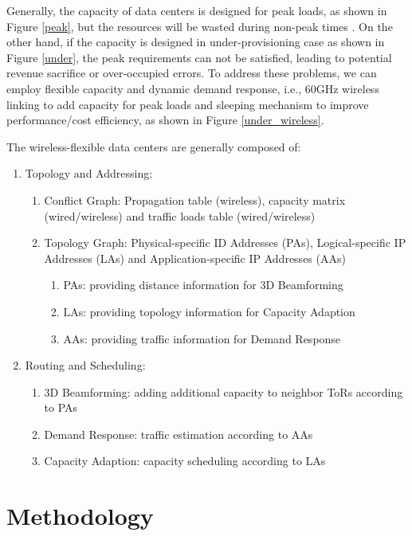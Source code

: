 \documentclass[journal,onecolumn,11pt]{IEEEtran}
\begin{document}
Generally, the capacity of data centers is designed for peak loads, as shown in Figure \ref{peak}, but the resources will be wasted during non-peak times \cite{Armbrust:2010:VCC:1721654.1721672}. On the other hand, if the capacity is designed in under-provisioning case as shown in Figure \ref{under}, the peak requirements can not be satisfied, leading to potential revenue sacrifice or over-occupied errors. To address these problems, we can employ flexible capacity and dynamic demand response, i.e., 60GHz wireless linking to add capacity for peak loads and sleeping mechanism to improve performance/cost efficiency, as shown in Figure \ref{under_wireless}.

The wireless-flexible data centers are generally composed of:
\begin{enumerate}
  \item Topology and Addressing:
  \begin{enumerate}
    \item Conflict Graph: Propagation table (wireless), capacity matrix (wired/wireless) and traffic loads table (wired/wireless)
    \item Topology Graph: Physical-specific ID Addresses (PAs), Logical-specific IP Addresses (LAs) and Application-specific IP Addresses (AAs)
        \begin{enumerate}
        \item PAs: providing distance information for 3D Beamforming
        \item LAs: providing topology information for Capacity Adaption
        \item AAs: providing traffic information for Demand Response
        \end{enumerate}
  \end{enumerate}
  \item Routing and Scheduling:
  \begin{enumerate}
    \item 3D Beamforming: adding additional capacity to neighbor ToRs according to PAs
    \item Demand Response: traffic estimation according to AAs
    \item Capacity Adaption: capacity scheduling according to LAs
  \end{enumerate}
\end{enumerate}

\section{Methodology}
\end{document}
